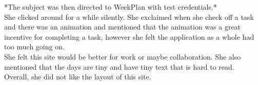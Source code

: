*The subject was then directed to WeekPlan with test credentials.*\\
She clicked around for a while silently. She exclaimed when she check off a task and there was an animation and mentioned that the animation was a great incentive for completing a task, however she felt the application as a whole had too much going on.\\
She felt this site would be better for work or maybe collaboration. She also mentioned that the days are tiny and have tiny text that is hard to read. \\
Overall, she did not like the layout of this site.